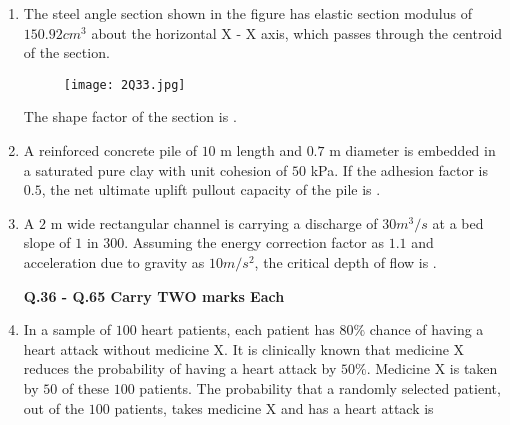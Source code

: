\documentclass[journal,12pt,onecolumn]{article}
\theoremstyle{remark}
\begin{document}
\begin{enumerate}
    \item The steel angle section shown in the figure  has elastic section modulus of
    $150.92 cm^3$ about the horizontal X - X axis, which passes through the centroid of
    the section.
    \begin{figure}[H]
        \centering
        \texttt{[image: 2Q33.jpg]}
        \caption{}
        \label{fig:q33}
    \end{figure}
    
    The shape factor of the section is \underline{\hspace{2cm}} .
    
    \hfill{}
    
    \item A reinforced concrete pile of $10$ m length and $0.7$ m diameter is embedded in a
    saturated pure clay with unit cohesion of $50$ kPa. If the adhesion factor is $0.5$, the
    net ultimate uplift pullout capacity  of the pile is \underline{\hspace{2cm}}
    .
    
    \hfill{}
    
    \item A $2$ m wide rectangular channel is carrying a discharge of $30 m^3/s$ at a bed slope of
    $1$ in $300$. Assuming the energy correction factor as $1.1$ and acceleration due to
    gravity as $10 m/s^2$, the critical depth of flow  is \underline{\hspace{2cm}} .
    
    \hfill{}

\textbf{Q.36 - Q.65 Carry TWO marks Each}

    \item In a sample of $100$ heart patients, each patient has $80\%$ chance of having a heart
    attack without medicine X. It is clinically known that medicine X reduces the
    probability of having a heart attack by $50\%$. Medicine X is taken by $50$ of these $100$
    patients. The probability that a randomly selected patient, out of the $100$ patients,
    takes medicine X and has a heart attack is
    
    \hfill{}
    \begin{enumerate}
    \end{enumerate}


\end{enumerate}
\end{document}

